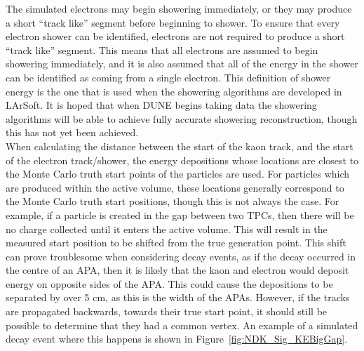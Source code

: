 The simulated electrons may begin showering immediately, or they may produce a short ``track like'' segment before beginning to shower. To ensure that every electron shower can be identified, electrons are not required to produce a short ``track like'' segment. This means that all electrons are assumed to begin showering immediately, and it is also assumed that all of the energy in the shower can be identified as coming from a single electron. This definition of shower energy is the one that is used when the showering algorithms are developed in LArSoft. It is hoped that when DUNE begins taking data the showering algorithms will be able to achieve fully accurate showering reconstruction, though this has not yet been achieved. \\

When calculating the distance between the start of the kaon track, and the start of the electron track/shower, the energy depositions whose locations are closest to the Monte Carlo truth start points of the particles are used. For particles which are produced within the active volume, these locations generally correspond to the Monte Carlo truth start positions, though this is not always the case. For example, if a particle is created in the gap between two TPCs, then there will be no charge collected until it enters the active volume. This will result in the measured start position to be shifted from the true generation point. This shift can prove troublesome when considering decay events, as if the decay occurred in the centre of an APA, then it is likely that the kaon and electron would deposit energy on opposite sides of the APA. This could cause the depositions to be separated by over 5 cm, as this is the width of the APAs. However, if the tracks are propagated backwards, towards their true start point, it should still be possible to determine that they had a common vertex. An example of a simulated decay event where this happens is shown in Figure~\ref{fig:NDK_Sig_KEBigGap}. \\

